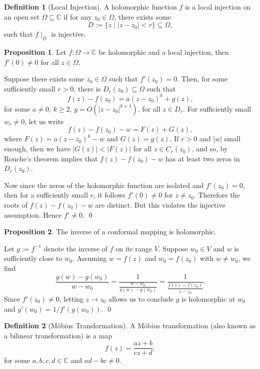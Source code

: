 \documentclass[
]{article}
\theoremstyle{definition}
\newtheorem{prop}{Proposition}
\theoremstyle{definition}
\newtheorem{definition}{Definition}[section]
\begin{document}
\begin{definition}[Local Injection]
  A holomorphic function \(f\) is a local injection on an open set \(\Omega \subseteq \mathbb{C}\) 
  if for any \(z_0 \in \Omega\), there exists some 
  \[D := \{z \mid |z - z_0| < r\} \subseteq \Omega,\]
  such that \(f\mid_D\) is injective.
\end{definition}

\begin{prop}
  Let \(f : \Omega \to \mathbb{C}\) be holomorphic and a local injection, then 
  \(f'(0) \neq 0\) for all \(z \in \Omega\). 
\end{prop}
\proof

Suppose there exists some \(z_0 \in \Omega\) such that \(f'(z_0) = 0\).
Then, for some sufficiently small \(r > 0\), there is
\(\overline{D_r(z_0)} \subseteq \Omega\) such that
\[f(z) - f(z_0) = a(z - z_0)^k + g(z),\] for some \(a \neq 0\),
\(k \ge 2\), \(g = O(|z - z_0|^{k + 1})\), for all \(z \in D_r\). For
sufficiently small \(w_r \neq 0\), let us write
\[f(z) - f(z_0) - w = F(z) + G(z),\] where \(F(z) = a(z - z_0)^k - w\)
and \(G(z) = g(z)\). If \(r > 0\) and \(|w|\) small enough, then we have
\(|G(z)| < |F(z)|\) for all \(z \in C_r(z_0)\), and so, by Rouche's
theorem implies that \(f(z) - f(z_0) - w\) has at least two zeros in
\(D_r(z_0)\).

Now since the zeros of the holomorphic function are isolated and
\(f'(z_0) = 0\), then for a sufficiently small \(r\), it follows
\(f'(0) \neq 0\) for \(z \neq z_0\). Therefore the roots of
\(f(z) - f(z_0) - w\) are distinct. But this violates the injective
assumption. Hence \(f'\neq 0\). \qed

\begin{prop}
  The inverse of a conformal mapping is holomorphic.
\end{prop}
\proof

Let \(g := f^{-1}\) denote the inverse of \(f\) on its range \(V\).
Suppose \(w_0 \in V\) and \(w\) is sufficiently close to \(w_0\).
Assuming \(w = f(z)\) and \(w_0 = f(z_0)\) with \(w \neq w_0\), we find
\[\frac{g(w) - g(w_0)}{w - w_0} = \frac{1}{\frac{w - w_0}{g(w) - g(w_0)}} = 
    \frac{1}{\frac{f(z) - f(z_0)}{z - z_0}}.\] Since \(f'(z_0) \neq 0\),
letting \(z \to z_0\) allows us to conclude \(g\) is holomorphic at
\(w_0\) and \(g'(w_0) = 1 / f'(g(w_0))\). \qed

\begin{definition}[Möbius Transformation]
  A Möbius transformation (also known as a bilinear transformation) is a map 
  \[f(z) = \frac{a z + b}{cz + d},\]
  for some \(a, b, c, d \in \mathbb{C}\) and \(ad - bc \neq 0\).
\end{definition}
\end{document}
